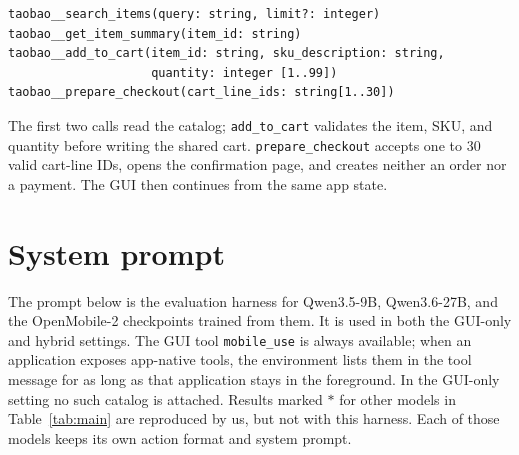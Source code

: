 \begin{lstlisting}[basicstyle=\ttfamily\small,frame=single,breaklines=true]
taobao__search_items(query: string, limit?: integer)
taobao__get_item_summary(item_id: string)
taobao__add_to_cart(item_id: string, sku_description: string,
                    quantity: integer [1..99])
taobao__prepare_checkout(cart_line_ids: string[1..30])
\end{lstlisting}

The first two calls read the catalog; \texttt{add\_to\_cart} validates the item, SKU, and quantity before writing the shared cart. \texttt{prepare\_checkout} accepts one to 30 valid cart-line IDs, opens the confirmation page, and creates neither an order nor a payment. The GUI then continues from the same app state.

\section{System prompt}
\label{app:sys-prompt}

The prompt below is the evaluation harness for Qwen3.5-9B, Qwen3.6-27B, and the OpenMobile-2 checkpoints trained from them. It is used in both the GUI-only and hybrid settings. The GUI tool \texttt{mobile\_use} is always available; when an application exposes app-native tools, the environment lists them in the tool message for as long as that application stays in the foreground. In the GUI-only setting no such catalog is attached. Results marked $*$ for other models in Table~\ref{tab:main} are reproduced by us, but not with this harness. Each of those models keeps its own action format and system prompt.

